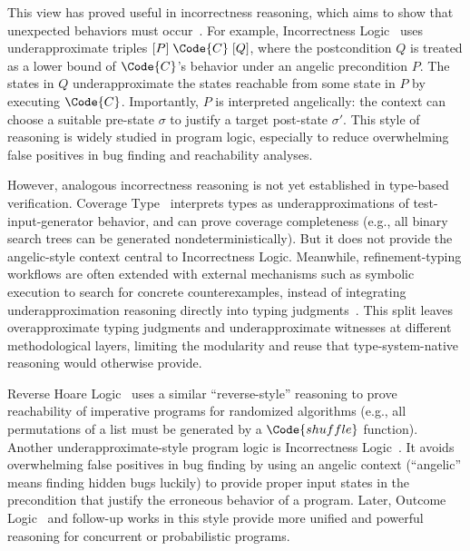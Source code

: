 This view has proved useful in incorrectness reasoning, which aims to show that unexpected behaviors must occur~\cite{OHP19}.
For example, Incorrectness Logic~\cite{OHP19} uses underapproximate triples $[P]\;\Code{C}\;[Q]$, where the postcondition $Q$ is treated as a lower bound of $\Code{C}$'s behavior under an angelic precondition $P$.
The states in $Q$ underapproximate the states reachable from some state in $P$ by executing $\Code{C}$.
Importantly, $P$ is interpreted angelically: the context can choose a suitable pre-state $\sigma$ to justify a target post-state $\sigma'$.
This style of reasoning is widely studied in program logic, especially to reduce overwhelming false positives in bug finding and reachability analyses.

However, analogous incorrectness reasoning is not yet established in type-based verification.
Coverage Type~\cite{CoverageType} interprets types as underapproximations of test-input-generator behavior, and can prove coverage completeness (e.g., all binary search trees can be generated nondeterministically).
But it does not provide the angelic-style context central to Incorrectness Logic.
Meanwhile, refinement-typing workflows are often extended with external mechanisms such as symbolic execution to search for concrete counterexamples, instead of integrating underapproximation reasoning directly into typing judgments~\cite{RefinementTypeSymbolicExecution}.
This split leaves overapproximate typing judgments and underapproximate witnesses at different methodological layers, limiting the modularity and reuse that type-system-native reasoning would otherwise provide.

Reverse Hoare Logic~\cite{ReverseHoareLogic} uses a similar ``reverse-style'' reasoning to prove reachability of imperative programs for randomized algorithms (e.g., all permutations of a list must be generated by a $\Code{shuffle}$ function). Another underapproximate-style program logic is Incorrectness Logic~\cite{OHP19}. It avoids overwhelming false positives in bug finding by using an angelic context (``angelic'' means finding hidden bugs luckily) to provide proper input states in the precondition that justify the erroneous behavior of a program. Later, Outcome Logic~\cite{ZDS23} and follow-up works in this style provide more unified and powerful reasoning for concurrent or probabilistic programs. 